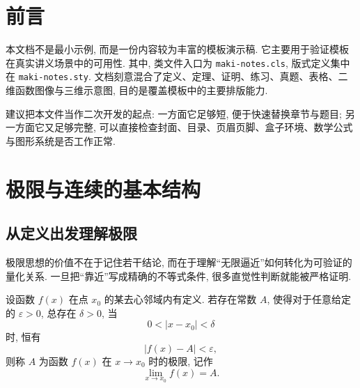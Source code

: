 \documentclass[a4paper,12pt,oneside]{maki-notes}
\begin{document}
\frontmatter
\MakeTitlePage

\chapter*{前言}
本文档不是最小示例, 而是一份内容较为丰富的模板演示稿. 它主要用于验证模板在真实讲义场景中的可用性. 其中, 类文件入口为 \texttt{maki-notes.cls}, 版式定义集中在 \texttt{maki-notes.sty}. 文档刻意混合了定义、定理、证明、练习、真题、表格、二维函数图像与三维示意图, 目的是覆盖模板中的主要排版能力.

建议把本文件当作二次开发的起点: 一方面它足够短, 便于快速替换章节与题目; 另一方面它又足够完整, 可以直接检查封面、目录、页眉页脚、盒子环境、数学公式与图形系统是否工作正常.

\tableofcontents

\mainmatter


\chapter{极限与连续的基本结构}

\section{从定义出发理解极限}

极限思想的价值不在于记住若干结论, 而在于理解“无限逼近”如何转化为可验证的量化关系. 一旦把“靠近”写成精确的不等式条件, 很多直觉性判断就能被严格证明.

\begin{definition}[函数极限]
设函数 $f(x)$ 在点 $x_0$ 的某去心邻域内有定义. 若存在常数 $A$, 使得对于任意给定的 $\varepsilon > 0$, 总存在 $\delta > 0$, 当
\[
0 < |x - x_0| < \delta
\]
时, 恒有
\[
|f(x) - A| < \varepsilon,
\]
则称 $A$ 为函数 $f(x)$ 在 $x \to x_0$ 时的极限, 记作
\[
\lim_{x \to x_0} f(x) = A.
\]
\end{definition}
\end{document}
